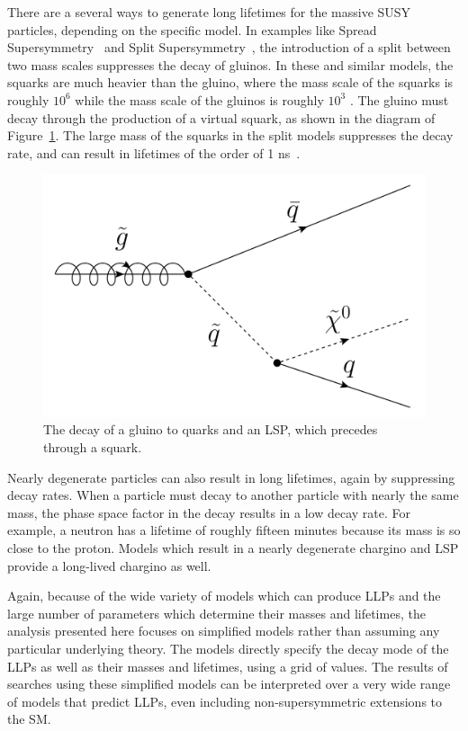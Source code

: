 There are a several ways to generate long lifetimes for the massive \ac{SUSY} particles, depending on the specific model.
In examples like Spread Supersymmetry~\cite{spreadsusy} and Split Supersymmetry~\cite{split1,split2}, the introduction of a split between two mass scales suppresses the decay of gluinos.
In these and similar models, the squarks are much heavier than the gluino, where the mass scale of the squarks is roughly $10^6$ \GeV while the mass scale of the gluinos is roughly $10^3$ \GeV.
The gluino must decay through the production of a virtual squark, as shown in the diagram of Figure~\ref{fig:gluino_decay}.
The large mass of the squarks in the split models suppresses the decay rate, and can result in lifetimes of the order of 1 ns~\cite{spreadsusy}.

\begin{figure}
\includegraphics[width=\fullfig]{figures/gluino_decay.png}
\caption{The decay of a gluino to quarks and an \acs*{LSP}, which precedes through a squark.}
\label{fig:gluino_decay}
\end{figure}

Nearly degenerate particles can also result in long lifetimes, again by suppressing decay rates.
When a particle must decay to another particle with nearly the same mass, the phase space factor in the decay results in a low decay rate.
For example, a neutron has a lifetime of roughly fifteen minutes because its mass is so close to the proton.
Models which result in a nearly degenerate chargino and \ac{LSP} provide a long-lived chargino as well.

Again, because of the wide variety of models which can produce \acp{LLP} and the large number of parameters which determine their masses and lifetimes, the analysis presented here focuses on simplified models rather than assuming any particular underlying theory.
The models directly specify the decay mode of the \acp{LLP} as well as their masses and lifetimes, using a grid of values.
The results of searches using these simplified models can be interpreted over a very wide range of models that predict \acp{LLP}, even including non-supersymmetric extensions to the \ac{SM}.
